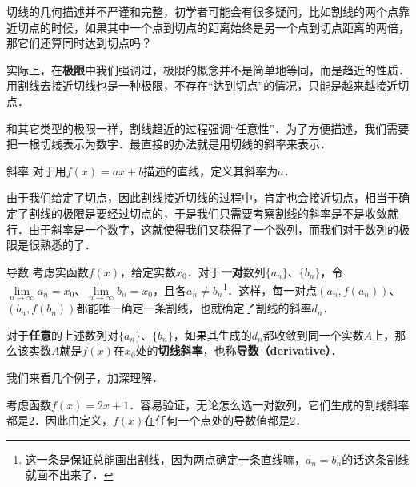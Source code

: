 
切线的几何描述并不严谨和完整，初学者可能会有很多疑问，比如割线的两个点靠近切点的时候，如果其中一个点到切点的距离始终是另一个点到切点距离的两倍，那它们还算同时达到切点吗？

实际上，在\textbf{极限}中我们强调过，极限的概念并不是简单地等同，而是趋近的性质．用割线去接近切线也是一种极限，不存在“达到切点”的情况，只能是越来越接近切点．

和其它类型的极限一样，割线趋近的过程强调“任意性”．为了方便描述，我们需要把一根切线表示为数字．最直接的办法就是用切线的斜率来表示．

\begin{definition}{斜率}
对于用$f(x)=ax+b$描述的直线，定义其斜率为$a$．
\end{definition}

由于我们给定了切点，因此割线接近切线的过程中，肯定也会接近切点，相当于确定了割线的极限是要经过切点的，于是我们只需要考察割线的斜率是不是收敛就行．由于斜率是一个数字，这就使得我们又获得了一个数列，而我们对于数列的极限是很熟悉的了．

\begin{definition}{导数}\label{Der2_def1}
考虑实函数$f(x)$，给定实数$x_0$．对于\textbf{一对}数列$\{a_n\}$、$\{b_n\}$，令$\lim\limits_{n\to\infty}a_n=x_0$、$\lim\limits_{n\to\infty}b_n=x_0$，且各$a_n\not=b_n$\footnote{这一条是保证总能画出割线，因为两点确定一条直线嘛，$a_n=b_n$的话这条割线就画不出来了．}．这样，每一对点$(a_n, f(a_n))$、$ (b_n, f(b_n))$都能唯一确定一条割线，也就确定了割线的斜率$d_n$．

对于\textbf{任意}的上述数列对$\{a_n\}$、$\{b_n\}$，如果其生成的$d_n$都收敛到同一个实数$A$上，那么该实数$A$就是$f(x)$在$x_0$处的\textbf{切线斜率}，也称\textbf{导数（derivative）}．
\end{definition}

我们来看几个例子，加深理解．

\begin{example}{}
考虑函数$f(x)=2x+1$．容易验证，无论怎么选一对数列，它们生成的割线斜率都是$2$．因此由定义，$f(x)$在任何一个点处的导数值都是$2$．
\end{example}

